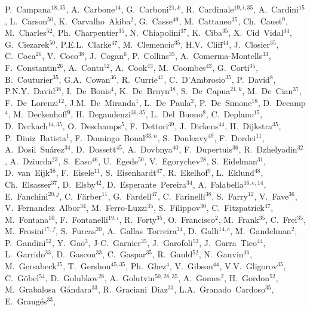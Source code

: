 \documentclass[12pt,a4paper]{article}
\begin{document}
\begin{titlepage}
\begin{center}
\begin{flushleft}
P.~Campana$^{18,35}$, 
A.~Carbone$^{14}$, 
G.~Carboni$^{21,k}$, 
R.~Cardinale$^{19,i,35}$, 
A.~Cardini$^{15}$, 
L.~Carson$^{50}$, 
K.~Carvalho~Akiba$^{2}$, 
G.~Casse$^{49}$, 
M.~Cattaneo$^{35}$, 
Ch.~Cauet$^{9}$, 
M.~Charles$^{52}$, 
Ph.~Charpentier$^{35}$, 
N.~Chiapolini$^{37}$, 
K.~Ciba$^{35}$, 
X.~Cid~Vidal$^{34}$, 
G.~Ciezarek$^{50}$, 
P.E.L.~Clarke$^{47}$, 
M.~Clemencic$^{35}$, 
H.V.~Cliff$^{44}$, 
J.~Closier$^{35}$, 
C.~Coca$^{26}$, 
V.~Coco$^{38}$, 
J.~Cogan$^{6}$, 
P.~Collins$^{35}$, 
A.~Comerma-Montells$^{33}$, 
F.~Constantin$^{26}$, 
A.~Contu$^{52}$, 
A.~Cook$^{43}$, 
M.~Coombes$^{43}$, 
G.~Corti$^{35}$, 
B.~Couturier$^{35}$, 
G.A.~Cowan$^{36}$, 
R.~Currie$^{47}$, 
C.~D'Ambrosio$^{35}$, 
P.~David$^{8}$, 
P.N.Y.~David$^{38}$, 
I.~De~Bonis$^{4}$, 
K.~De~Bruyn$^{38}$, 
S.~De~Capua$^{21,k}$, 
M.~De~Cian$^{37}$, 
F.~De~Lorenzi$^{12}$, 
J.M.~De~Miranda$^{1}$, 
L.~De~Paula$^{2}$, 
P.~De~Simone$^{18}$, 
D.~Decamp$^{4}$, 
M.~Deckenhoff$^{9}$, 
H.~Degaudenzi$^{36,35}$, 
L.~Del~Buono$^{8}$, 
C.~Deplano$^{15}$, 
D.~Derkach$^{14,35}$, 
O.~Deschamps$^{5}$, 
F.~Dettori$^{39}$, 
J.~Dickens$^{44}$, 
H.~Dijkstra$^{35}$, 
P.~Diniz~Batista$^{1}$, 
F.~Domingo~Bonal$^{33,n}$, 
S.~Donleavy$^{49}$, 
F.~Dordei$^{11}$, 
A.~Dosil~Su\'{a}rez$^{34}$, 
D.~Dossett$^{45}$, 
A.~Dovbnya$^{40}$, 
F.~Dupertuis$^{36}$, 
R.~Dzhelyadin$^{32}$, 
A.~Dziurda$^{23}$, 
S.~Easo$^{46}$, 
U.~Egede$^{50}$, 
V.~Egorychev$^{28}$, 
S.~Eidelman$^{31}$, 
D.~van~Eijk$^{38}$, 
F.~Eisele$^{11}$, 
S.~Eisenhardt$^{47}$, 
R.~Ekelhof$^{9}$, 
L.~Eklund$^{48}$, 
Ch.~Elsasser$^{37}$, 
D.~Elsby$^{42}$, 
D.~Esperante~Pereira$^{34}$, 
A.~Falabella$^{16,e,14}$, 
E.~Fanchini$^{20,j}$, 
C.~F\"{a}rber$^{11}$, 
G.~Fardell$^{47}$, 
C.~Farinelli$^{38}$, 
S.~Farry$^{12}$, 
V.~Fave$^{36}$, 
V.~Fernandez~Albor$^{34}$, 
M.~Ferro-Luzzi$^{35}$, 
S.~Filippov$^{30}$, 
C.~Fitzpatrick$^{47}$, 
M.~Fontana$^{10}$, 
F.~Fontanelli$^{19,i}$, 
R.~Forty$^{35}$, 
O.~Francisco$^{2}$, 
M.~Frank$^{35}$, 
C.~Frei$^{35}$, 
M.~Frosini$^{17,f}$, 
S.~Furcas$^{20}$, 
A.~Gallas~Torreira$^{34}$, 
D.~Galli$^{14,c}$, 
M.~Gandelman$^{2}$, 
P.~Gandini$^{52}$, 
Y.~Gao$^{3}$, 
J-C.~Garnier$^{35}$, 
J.~Garofoli$^{53}$, 
J.~Garra~Tico$^{44}$, 
L.~Garrido$^{33}$, 
D.~Gascon$^{33}$, 
C.~Gaspar$^{35}$, 
R.~Gauld$^{52}$, 
N.~Gauvin$^{36}$, 
M.~Gersabeck$^{35}$, 
T.~Gershon$^{45,35}$, 
Ph.~Ghez$^{4}$, 
V.~Gibson$^{44}$, 
V.V.~Gligorov$^{35}$, 
C.~G\"{o}bel$^{54}$, 
D.~Golubkov$^{28}$, 
A.~Golutvin$^{50,28,35}$, 
A.~Gomes$^{2}$, 
H.~Gordon$^{52}$, 
M.~Grabalosa~G\'{a}ndara$^{33}$, 
R.~Graciani~Diaz$^{33}$, 
L.A.~Granado~Cardoso$^{35}$, 
E.~Graug\'{e}s$^{33}$, 

\end{flushleft}
\end{center}
\end{titlepage}
\end{document}
